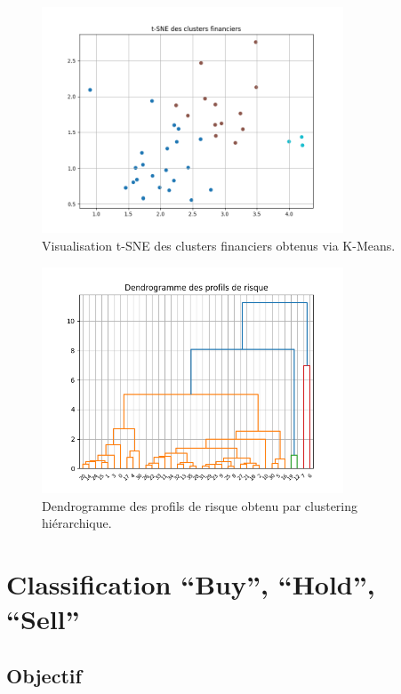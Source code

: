 \documentclass[a4paper,12pt]{article}
\begin{document}
\begin{figure}[h!]
    \centering
    \includegraphics[width=0.8\textwidth]{t_sne.png}
    \caption{Visualisation t-SNE des clusters financiers obtenus via K-Means.}
    \label{fig:tsne_financial}
\end{figure}

\begin{figure}[h!]
    \centering
    \includegraphics[width=0.8\textwidth]{dendogramme.png}
    \caption{Dendrogramme des profils de risque obtenu par clustering hiérarchique.}
    \label{fig:dendrogram_risk}
\end{figure}



\section{Classification “Buy”, “Hold”, “Sell”}

\subsection*{Objectif}
\end{document}
